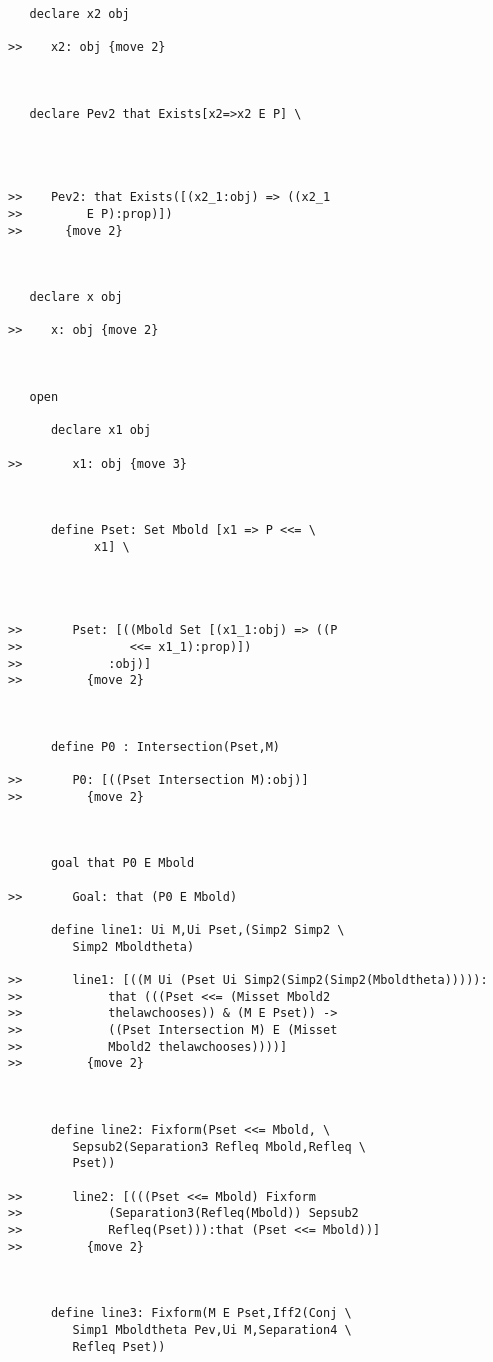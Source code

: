 \documentclass[12pt]{article}
\begin{document}
\begin{verbatim}
   declare x2 obj

>>    x2: obj {move 2}



   declare Pev2 that Exists[x2=>x2 E P] \
      



>>    Pev2: that Exists([(x2_1:obj) => ((x2_1
>>         E P):prop)])
>>      {move 2}



   declare x obj

>>    x: obj {move 2}



   open

      declare x1 obj

>>       x1: obj {move 3}



      define Pset: Set Mbold [x1 => P <<= \
            x1] \
         



>>       Pset: [((Mbold Set [(x1_1:obj) => ((P
>>               <<= x1_1):prop)])
>>            :obj)]
>>         {move 2}



      define P0 : Intersection(Pset,M)

>>       P0: [((Pset Intersection M):obj)]
>>         {move 2}



      goal that P0 E Mbold

>>       Goal: that (P0 E Mbold)

      define line1: Ui M,Ui Pset,(Simp2 Simp2 \
         Simp2 Mboldtheta)

>>       line1: [((M Ui (Pset Ui Simp2(Simp2(Simp2(Mboldtheta))))):
>>            that (((Pset <<= (Misset Mbold2
>>            thelawchooses)) & (M E Pset)) ->
>>            ((Pset Intersection M) E (Misset
>>            Mbold2 thelawchooses))))]
>>         {move 2}



      define line2: Fixform(Pset <<= Mbold, \
         Sepsub2(Separation3 Refleq Mbold,Refleq \
         Pset))

>>       line2: [(((Pset <<= Mbold) Fixform
>>            (Separation3(Refleq(Mbold)) Sepsub2
>>            Refleq(Pset))):that (Pset <<= Mbold))]
>>         {move 2}



      define line3: Fixform(M E Pset,Iff2(Conj \
         Simp1 Mboldtheta Pev,Ui M,Separation4 \
         Refleq Pset))


\end{verbatim}
\end{document}
